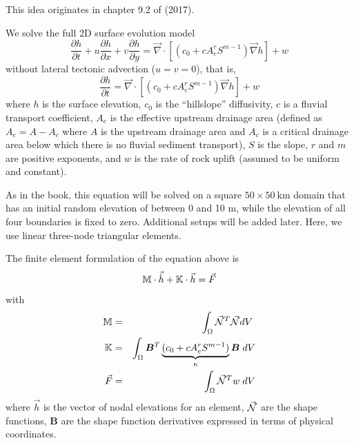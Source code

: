 This \stone idea originates in chapter 9.2 of \textcite{simp17} (2017). 

We solve the full 2D surface evolution model 
\begin{equation}
\frac{\partial h}{\partial t}
+ u \frac{\partial h}{\partial x}
+ v \frac{\partial h}{\partial y}
= \vec\nabla\cdot \left[ (c_0 + c A_e^r S^{m-1}) \vec\nabla h \right] + w
\end{equation}
without lateral tectonic advection ($u=v=0$), that is,
\begin{equation}
\frac{\partial h}{\partial t}
= \vec\nabla\cdot \left[ (c_0 + c A_e^r S^{m-1}) \vec\nabla h \right] + w
\end{equation}
where $h$ is the surface elevation, 
$c_0$ is the ``hillslope'' diffusivity, 
$c$ is a fluvial transport coefficient, $A_e$ 
is the effective upstream drainage area (defined as $A_e = A - A_c$ 
where $A$ is the upstream drainage
area and $A_c$ is a critical drainage area below which there is no fluvial sediment transport),
$S$ is the slope, 
$r$ and $m$ are positive exponents, and $w$ is the rate of rock uplift (assumed to be uniform and constant).

As in the book, this equation will be solved on a square $50\times 50~\si{\km}$ 
domain that has an initial random elevation of
between 0 and 10 m, while the elevation of all four boundaries is fixed to zero. 
Additional setups will be added later. Here, we use linear three-node triangular elements.

The finite element formulation of the equation above is 
\[
{\mathbb{M}} \cdot \vec{\dot h} + {\mathbb{K}} \cdot \vec{h} = \vec{F} 
\]
with 
\begin{eqnarray}
{\mathbb{M}} &=& \int_\Omega \vec{{\mathcal{N}}}^T \vec{{\mathcal{N}}} dV \; \nonumber\\
{\mathbb{K}} &=& \int_\Omega {\bm B}^T \underbrace{(c_0 + c A_e^r S^{m-1})}_{\kappa}  {\bm B} \;  dV \nonumber\\
\vec{F} &=& \int_\Omega  \vec{{\mathcal{N}}}^T w \; dV
\end{eqnarray}
where $\vec{h}$ is the vector of nodal elevations for an element, $\vec{{\mathcal{N}}}$ 
are the shape functions, ${\bm B}$ are the shape function derivatives expressed 
in terms of physical coordinates.

